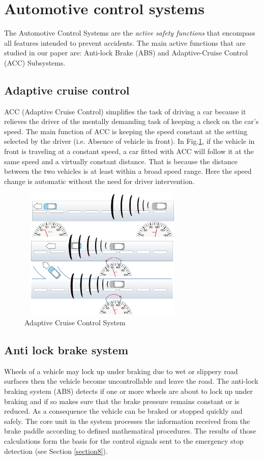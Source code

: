 \documentclass[3p,times,procedia,authoryear,round]{elsarticle}
\begin{document}
\section{Automotive control systems}
\label{Automotive Systems}
 The Automotive Control Systems are the \emph{active safety functions} \citep{Reif2014} that encompass all features intended to prevent accidents. The main active functions that are studied in our paper are: Anti-lock Brake (ABS) and Adaptive-Cruise Control (ACC) Subsystems.

\subsection{Adaptive cruise control}
ACC (Adaptive Cruise Control) \citep{Reif2014} simplifies the task of driving a car because it relieves the driver of the mentally demanding task of keeping a check on the car’s speed. The main function of ACC is keeping the speed constant at the setting selected by the driver (i.e. Absence of vehicle in front). In Fig.\ref{ACCbig}, if the vehicle in front is traveling at a constant speed, a car fitted with ACC will follow it at the same speed and a virtually constant distance. That is because the distance between the two vehicles is at least within a broad speed range. Here the speed change is automatic without the need for driver intervention. 

\begin{figure}[!ht]
	\centering
	\includegraphics[width=3.2in, height =2.5in]{ACC.jpg}
	\caption{Adaptive Cruise Control System}
	
	\label{ACCbig}
\end{figure}
\subsection{Anti lock brake system}

Wheels of a vehicle may lock up under braking due to wet or slippery road surfaces then the vehicle become uncontrollable and leave the road. The anti-lock braking system (ABS) detects if one or more wheels are about to lock up under braking and if so makes sure that the brake pressure remains constant or is reduced. As a consequence the vehicle can be braked or stopped quickly and safely. The core unit in the system processes the information received from the brake paddle according to defined mathematical procedures. The results of those calculations form the basis for the control signals sent to the emergency stop detection (see Section \ref{section8}).
\end{document}
